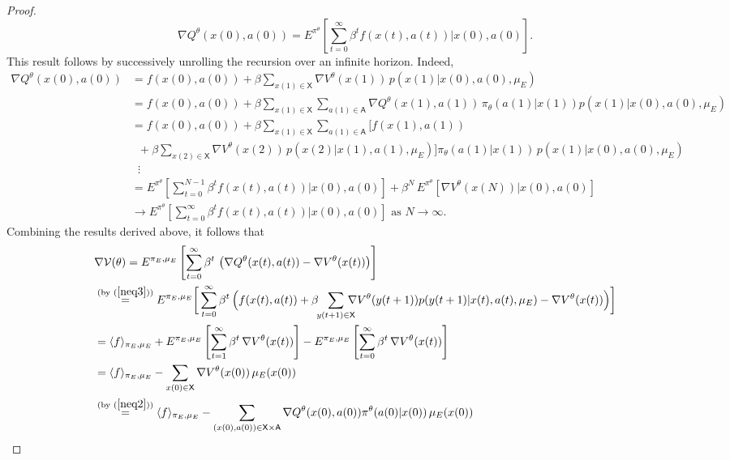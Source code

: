 \documentclass[11pt]{article}
\newcommand{\sX}{{\mathsf X}}
\newcommand{\sA}{{\mathsf A}}
\newcommand{\V}{{\mathcal V}}
\begin{document}
\begin{proof}
$$\nabla Q^{\theta}(x(0),a(0)) =  E^{\pi^{\theta}} \left[ \sum_{t=0}^{\infty} \beta^t f(x(t),a(t)) \bigg| x(0),a(0)\right]. \label{neq4}$$
This result follows by successively unrolling the recursion over an infinite horizon. Indeed,
\begin{align*}
\nabla Q^{\theta}(x(0),a(0))  &= f(x(0),a(0)) + \beta  \sum_{x(1) \in \sX} \nabla V^{\theta}(x(1)) \, p(x(1)|x(0),a(0),\mu_E)\\
&= f(x(0),a(0))  + \beta \! \sum_{x(1) \in \sX} \sum_{a(1) \in \sA} \nabla Q^{\theta}(x(1),a(1)) \, \pi_{\theta}(a(1)|x(1)) p(x(1)|x(0),a(0),\mu_E) \\
&= f(x(0),a(0)) + \beta \! \sum_{x(1) \in \sX} \sum_{a(1) \in \sA} \bigg[f(x(1),a(1)) \\ &\phantom{x} +\beta \sum_{x(2) \in \sX} \nabla V^{\theta}(x(2)) \, p(x(2)|x(1),a(1),\mu_E)\bigg] \pi_{\theta}(a(1)|x(1))\, p(x(1)|x(0),a(0),\mu_E) \\
&\phantom{x}\vdots \\
&= E^{\pi^{\theta}} \left[ \sum_{t=0}^{N-1} \beta^t f(x(t),a(t)) \bigg| x(0),a(0)\right] + \beta^N \, E^{\pi^{\theta}} \left[ \nabla V^{\theta}(x(N)) \bigg| x(0),a(0)\right] \\
&\rightarrow E^{\pi^{\theta}} \left[ \sum_{t=0}^{\infty} \beta^t f(x(t),a(t)) \bigg| x(0),a(0)\right] \,\, \text{as} \,\, N \rightarrow \infty.
\end{align*} 
Combining the results derived above, it follows that
\begin{align*}
&\nabla \V(\theta) = E^{\pi_E,\mu_E} \left[\sum_{t=0}^{\infty} \beta^t \, \left(\nabla Q^{\theta}(x(t),a(t))-\nabla V^{\theta}(x(t))\right) \right] \\
&\stackrel{(\text{by} \,\, (\ref{neq3}))}{=} E^{\pi_E,\mu_E} \bigg[\sum_{t=0}^{\infty} \beta^t \, \Big(f(x(t),a(t)) + \beta \! \! \sum_{y(t+1) \in \sX} \!\!\!\!\! \nabla V^{\theta}(y(t+1)) p(y(t+1)|x(t),a(t),\mu_E) -\nabla V^{\theta}(x(t)) \Big) \bigg] \\
&= \langle f \rangle_{\pi_E,\mu_E} + E^{\pi_E,\mu_E} \left[\sum_{t=1}^{\infty} \beta^t \, \nabla V^{\theta}(x(t)) \right] - E^{\pi_E,\mu_E} \left[\sum_{t=0}^{\infty} \beta^t \, \nabla V^{\theta}(x(t)) \right] \\
&= \langle f \rangle_{\pi_E,\mu_E}  - \sum_{x(0) \in \sX}  \nabla V^{\theta}(x(0)) \, \mu_E(x(0)) \\ &\stackrel{(\text{by} \,\, (\ref{neq2}))}{=} \langle f \rangle_{\pi_E,\mu_E}  - \sum_{(x(0),a(0)) \in \sX \times \sA}  \nabla Q^{\theta}(x(0),a(0)) \pi^{\theta}(a(0)|x(0)) \, \mu_E(x(0)) \\

\end{align*}
\end{proof}
\end{document}
